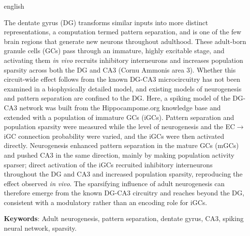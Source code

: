 \begin{resumo}[Abstract]
\begin{otherlanguage*}{english}

The dentate gyrus (DG) transforms similar inputs into more distinct representations, a computation termed pattern separation, and
is one of the few brain regions that generate new neurons throughout adulthood. These adult-born granule cells (GCs) pass through
an immature, highly excitable stage, and activating them \textit{in vivo} recruits inhibitory interneurons and increases
population sparsity across both the DG and CA3 (Cornu Ammonis area 3). Whether this circuit-wide effect follows from the known
DG-CA3 microcircuitry has not been examined in a biophysically detailed model, and existing models of neurogenesis and pattern
separation are confined to the DG\@. Here, a spiking model of the DG-CA3 network was built from the Hippocampome.org knowledge
base and extended with a population of immature GCs (iGCs). Pattern separation and population sparsity were measured while the
level of neurogenesis and the EC$\to$iGC connection probability were varied, and the iGCs were then activated directly.
Neurogenesis enhanced pattern separation in the mature GCs (mGCs) and pushed CA3 in the same direction, mainly by making
population activity sparser; direct activation of the iGCs recruited inhibitory interneurons throughout the DG and CA3 and
increased population sparsity, reproducing the effect observed \textit{in vivo}. The sparsifying influence of adult neurogenesis
can therefore emerge from the known DG-CA3 circuitry and reaches beyond the DG, consistent with a modulatory rather than an
encoding role for iGCs.

\noindent \textbf{Keywords}: Adult neurogenesis, pattern separation, dentate gyrus, CA3, spiking neural network, sparsity.
\end{otherlanguage*}
\end{resumo}
